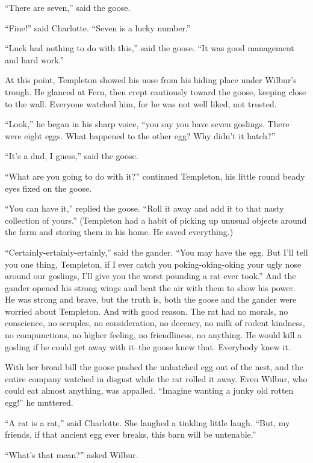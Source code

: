 \documentclass[a4paper, oneside]{book}
\begin{document}
 ``There are seven,'' said the goose.

 ``Fine!'' said Charlotte. ``Seven is a lucky number.''

 ``Luck had nothing to do with this,'' said the goose. ``It was good
management and hard work.''

 At this point, Templeton showed his nose from his hiding place
under Wilbur's trough. He glanced at Fern, then crept cautiously
toward the goose, keeping close to the wall. Everyone watched him,
for he was not well liked, not trusted.

 ``Look,'' he began in his sharp voice, ``you say you have seven
goslings. There were eight eggs. What happened to the other egg?
Why didn't it hatch?''

 ``It's a dud, I guess,'' said the goose.

 ``What are you going to do with it?'' continued Templeton, his
little round beady eyes fixed on the goose. 

 ``You can have it,'' replied the goose. ``Roll it away and add it to 
that nasty collection of yours.'' (Templeton had a habit of picking
up unusual objects around the farm and storing them in his home.
He saved everything.)

 ``Certainly-ertainly-ertainly,'' said the gander. ``You may have the
egg. But I'll tell you one thing, Templeton, if I ever catch you
poking-oking-oking your ugly nose around our goslings, I'll give
you the worst pounding a rat ever took.'' And the gander opened
his strong wings and beat the air with them to show his power. He
was strong and brave, but the truth is, both the goose and the
gander were worried about Templeton. And with good reason. The
rat had no morals, no conscience, no scruples, no consideration, no
decency, no milk of rodent kindness, no compunctions, no higher
feeling, no friendliness, no anything. He would kill a gosling if he
could get away with it--the goose knew that. Everybody knew it. 

 With her broad bill the goose pushed the unhatched egg out of the
nest, and the entire company watched in disgust while the rat
rolled it away. Even Wilbur, who could eat almost anything, was
appalled. ``Imagine wanting a junky old rotten egg!'' he muttered.

 ``A rat is a rat,'' said Charlotte. She laughed a tinkling little laugh.
``But, my friends, if that ancient egg ever breaks, this barn will be
untenable.'' 

 ``What's that mean?'' asked Wilbur.
\end{document}
